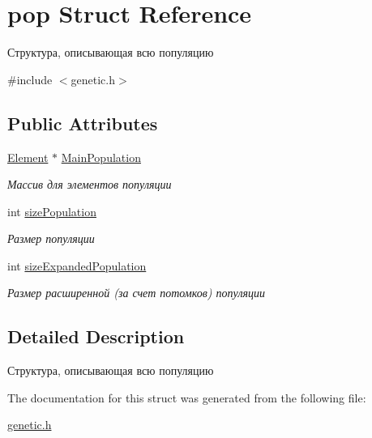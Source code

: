 \hypertarget{structpop}{}\section{pop Struct Reference}
\label{structpop}


Структура, описывающая всю популяцию  




{\ttfamily \#include $<$genetic.\+h$>$}

\subsection*{Public Attributes}
\begin{DoxyCompactItemize}
\item 
\mbox{\label{structpop_a4d82c38babfc43dee1b7dac63f420504}} 
\mbox{\hyperlink{genetic_8h_aaab65b87524a4fa4c577e791bca5d772}{Element}} $\ast$ \mbox{\hyperlink{structpop_a4d82c38babfc43dee1b7dac63f420504}{Main\+Population}}
\begin{DoxyCompactList}\small\item\em Массив для элементов популяции \end{DoxyCompactList}\item 
\mbox{\label{structpop_a7e49db4f9d86c07ef748e4bdca6c31d4}} 
int \mbox{\hyperlink{structpop_a7e49db4f9d86c07ef748e4bdca6c31d4}{size\+Population}}
\begin{DoxyCompactList}\small\item\em Размер популяции \end{DoxyCompactList}\item 
\mbox{\label{structpop_a50a482027bae49ac9b05bd592dc4c59c}} 
int \mbox{\hyperlink{structpop_a50a482027bae49ac9b05bd592dc4c59c}{size\+Expanded\+Population}}
\begin{DoxyCompactList}\small\item\em Размер расширенной (за счет потомков) популяции \end{DoxyCompactList}\end{DoxyCompactItemize}


\subsection{Detailed Description}
Структура, описывающая всю популяцию 

The documentation for this struct was generated from the following file\+:\begin{DoxyCompactItemize}
\item 
\mbox{\hyperlink{genetic_8h}{genetic.\+h}}\end{DoxyCompactItemize}
